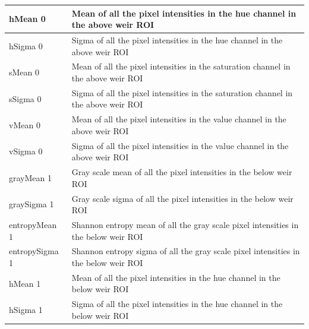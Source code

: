\documentclass[conference]{IEEEtran}
\begin{document}
\begin{table}[H]
\begin{center}
\begin{tabular}{|m{5em}|m{17em}|}
 \hline
 hMean 0 & Mean of all the pixel intensities in the hue channel in the above weir ROI \\
 \hline
 hSigma 0 & Sigma of all the pixel intensities in the hue channel in the above weir ROI \\
 \hline
 sMean 0 & Mean of all the pixel intensities in the saturation channel in the above weir ROI \\
 \hline
 sSigma 0 & Sigma of all the pixel intensities in the saturation channel in the above weir ROI \\
 \hline
 vMean 0 & Mean of all the pixel intensities in the value channel in the above weir ROI \\
 \hline
 vSigma 0 & Sigma of all the pixel intensities in the value channel in the above weir ROI \\
 \hline
 grayMean 1 & Gray scale mean of all the pixel intensities in the below weir ROI \\
 \hline
 graySigma 1 & Gray scale sigma of all the pixel intensities in the below weir ROI \\
 \hline
 entropyMean 1 & Shannon entropy mean of all the gray scale pixel intensities in the below weir ROI \\
 \hline
 entropySigma 1 & Shannon entropy sigma of all the gray scale pixel intensities in the below weir ROI \\
 \hline
 hMean 1 & Mean of all the pixel intensities in the hue channel in the below weir ROI \\
 \hline
 hSigma 1 & Sigma of all the pixel intensities in the hue channel in the below weir ROI \\
 \hline
\end{tabular}
\end{center}
\end{table}
\end{document}
